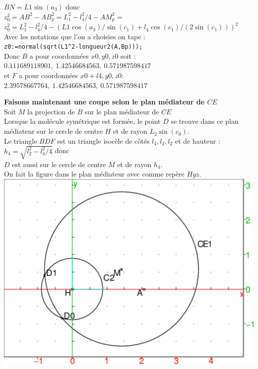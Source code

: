 \documentclass[a4paper,11pt]{book}
\begin{document}
$BN=L1\sin(a_3)$ donc\\
$z_0^2=AB^2-AB_p^2=L_1^2-l_4^2/4-AM_p^2=$\\
$z_0^2=L_1^2-l_4^2/4-(L1\cos(a_3)/\sin(c_1)+l_4\cos(c_1)/(2\sin(c_1)))^2$\\
Avec les notations que l'on a choisies on tape : \\
{\tt z0:=normal(sqrt(L1\verb|^|2-longueur2(A,Bp)));}\\
Donc $B$ a pour coordonn\'ees $x0,y0,z0$ soit :\\
$0.111689118901,\ 1.42546684563,\ 0.571987598417$\\
et $F$ a pour coordonn\'ees $x0+l4,y0,z0$:\\
$2.39578667764,\ 1.42546684563,\ 0.571987598417$

{\bf Faisons maintenant une coupe selon le plan m\'ediateur de $CE$}\\
Soit $M$ la projection de $B$ sur le plan m\'ediateur de $CE$\\
Lorsque la mol\'ecule sym\'etrique est form\'ee, le point $D$ se trouve dans ce 
plan m\'ediateur sur le cercle de centre $H$ et de rayon $L_2\sin(c_0)$.\\
Le triangle $BDF$ est un triangle isoc\`ele de c\^ot\'es $l_4,l_2,l_2$ et de 
hauteur :\\
 $\displaystyle h_4=\sqrt{l_2^2-l_4^2/4}$ donc\\
 $D$ est aussi sur le cercle de centre $M$ et de rayon $h_4$.\\
On fait la figure dans le plan m\'ediateur avec comme rep\`ere $Hyz$.\\
\includegraphics[width=\textwidth]{glucomed}\\
\end{document}

